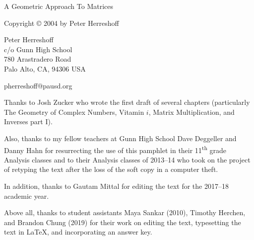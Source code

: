 \documentclass[../gatm.tex]{subfiles}
\begin{document}
\newcommand\dnew{\vspace{1cm}}

\begin{center}
\vspace*{\fill}

\doublespacing
A Geometric Approach To Matrices

Copyright \copyright{} 2004 by Peter Herreshoff

\vspace{1cm}

Peter Herreshoff\\
c/o Gunn High School\\
780 Arastradero Road\\
Palo Alto, CA, 94306 USA

\vspace{.5cm}

pherreshoff@pausd.org

\vspace{1cm}
\end{center}

\noindent Thanks to Josh Zucker who wrote the first draft of several chapters (particularly The Geometry of Complex Numbers, Vitamin $i$, Matrix Multiplication, and Inverses part I).

Also, thanks to my fellow teachers at Gunn High School Dave Deggeller and Danny Hahn for resurrecting the use of this pamphlet in their 11\textsuperscript{th} grade Analysis classes and to their Analysis classes of 2013--14 who took on the project of retyping the text after the loss of the soft copy in a computer theft.

In addition, thanks to Gautam Mittal for editing the text for the 2017--18 academic year.

Above all, thanks to student assistants Maya Sankar (2010), Timothy Herchen, and Brandon Chung (2019) for their work on editing the text, typesetting the text in \LaTeX{}, and incorporating an answer key.

\vspace*{\fill}
\end{document}
